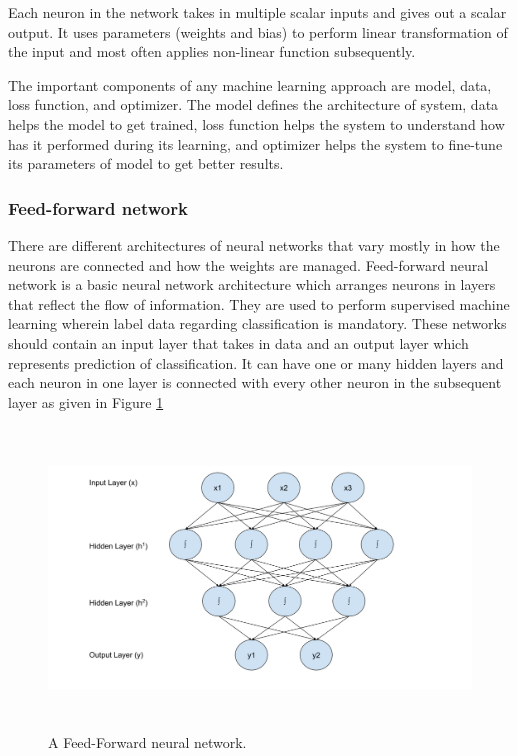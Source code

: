 \documentclass[a4paper, 11pt]{article}
\begin{document}
Each neuron in the network takes in multiple scalar inputs and gives out a scalar output. It uses parameters (weights and bias) to perform linear transformation of the input and most often applies non-linear function subsequently.

The important components of any machine learning approach are model, data, loss function, and optimizer. The model defines the architecture of system, data helps the model to get trained, loss function helps the system to understand how has it performed during its learning, and optimizer helps the system to fine-tune its parameters of model to get better results.

\subsubsection{Feed-forward network}

There are different architectures of neural networks that vary mostly in how the neurons are connected and how the weights are managed. Feed-forward neural network \parencite{Svozil1997} is a basic neural network architecture which arranges neurons in layers that reflect the flow of information. They are used to perform supervised machine learning wherein label data regarding classification is mandatory. These networks should contain an input layer that takes in data and an output layer which represents prediction of classification. It can have one or many hidden layers and each neuron in one layer is connected with every other neuron in the subsequent layer as given in Figure \ref{fig:Feed forward neural network}

\begin{figure}[htpb]
    \centering
    \includegraphics[width=\textwidth,height=8cm,keepaspectratio=true]
    {feed-forward-neural-network.png}
    \caption{
        A Feed-Forward neural network.
    }
    \label{fig:Feed forward neural network}
\end{figure}
\end{document}

